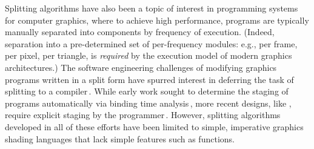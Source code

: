 Splitting algorithms have also been a topic of interest in programming
systems for computer graphics, where to achieve high performance,
programs are typically manually separated into components by frequency
of execution. (Indeed, separation into a pre-determined set of
per-frequency modules: e.g., per frame, per pixel, per triangle, is
\emph{required} by the execution model of modern graphics
architectures.)  The software engineering challenges of modifying
graphics programs written in a split form have spurred interest in
deferring the task of splitting to a compiler\,\cite{Foley:2011}.
While early work sought to determine the staging of programs
automatically via binding time analysis\,\cite{knoblock96}, more
recent designs, like \lang, require explicit staging by the
programmer\,\cite{Proudfoot:2001,Foley:2011,He:2014}.  However,
splitting algorithms developed in all of these efforts have been
limited to simple, imperative graphics shading languages that lack
simple features such as functions.















